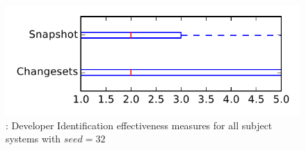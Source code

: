 
\begin{figure}
\centering
\includegraphics[height=0.4\textheight]{figures/dit_seed/rq1_tiny_32}
\caption{\rtwo: Developer Identification effectiveness measures for all subject systems with $seed=32$}
\label{fig:dit_seed:rq1:tiny}
\end{figure}

